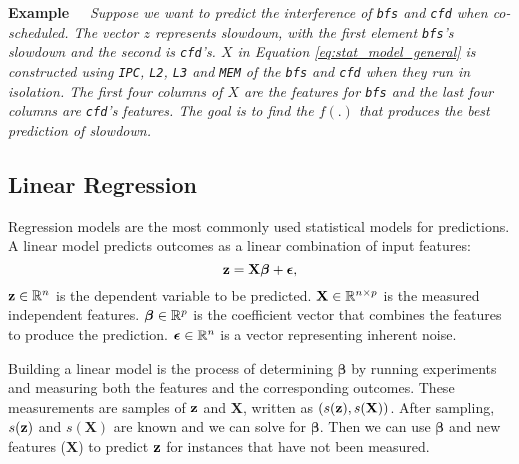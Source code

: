 
\noindent \textbf{Example~~}\textit{ Suppose we want to predict the
  interference of \texttt{bfs} and \texttt{cfd} when co-scheduled.
  The vector $z$ represents slowdown, with the first element
  \texttt{bfs}'s slowdown and the second is \texttt{cfd}'s.  $X$ in
  Equation \eqref{eq:stat_model_general} is constructed using
  \texttt{IPC}, \texttt{L2}, \texttt{L3} and \texttt{MEM} of the
  \texttt{bfs} and \texttt{cfd} when they run in isolation. The first
  four columns of $X$ are the features for \texttt{bfs} and the last
  four columns are \texttt{cfd}'s features.  The goal is to find the
  $f(.)$ that produces the best prediction of slowdown.  }

\subsection{Linear Regression}
\label{sec:est-intro}
Regression models are the most commonly used statistical models for
predictions.  A linear model predicts outcomes as a linear combination
of input features:
\begin{equation}
\label{eq:linear}
\mathbf{z} = \mathbf{X}\boldsymbol{\beta} + \boldsymbol{\epsilon},
\end{equation}
$\mathbf{z}\in \mathbb{R}^{n}$ is the dependent variable to be predicted.  $\mathbf{X}
\in \mathbb{R}^{n \times p}$ is the measured independent features.
$\boldsymbol{\boldsymbol{\beta}} \in \mathbb{R}^{p}$ is the coefficient vector
that combines the features to produce the prediction.
$\boldsymbol{\epsilon} \in \mathbb{R}^{n}$ is a vector representing inherent
noise.

Building a linear model is the process of determining
$\boldsymbol{\boldsymbol{\beta}}$ by running experiments and measuring
both the features and the corresponding outcomes.  These measurements
are samples of $\mathbf{z}$ and $\mathbf{X}$, written as $(s(\mathbf{z}),
s(\mathbf{X}))$.  After sampling, $s(\mathbf{z})$ and $s(\mathbf{X})$ are
known and we can solve for $\boldsymbol{\beta}$. Then we can use
$\boldsymbol{\boldsymbol{\beta}}$ and new features ($\mathbf{X}$) to
predict $\mathbf{z}$ for instances that have not been measured.


